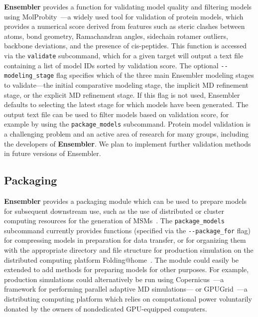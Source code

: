 \documentclass[10pt,letterpaper]{article}
\begin{document}
{\bf Ensembler} provides a function for validating model quality and filtering models using MolProbity~\cite{molprobity:2007,molprobity:2010}---a widely used tool for validation of protein models, which provides a numerical score derived from features such as steric clashes between atoms, bond geometry, Ramachandran angles, sidechain rotamer outliers, backbone deviations, and the presence of cis-peptides.
This function is accessed via the {\tt validate} subcommand, which for a given target will output a text file containing a list of model IDs sorted by validation score.
The optional {\tt -{}-modeling\_stage} flag specifies which of the three main Ensembler modeling stages to validate---the initial comparative modeling stage, the implicit MD refinement stage, or the explicit MD refinement stage.
If this flag is not used, Ensembler defaults to selecting the latest stage for which models have been generated.
The output text file can be used to filter models based on validation score, for example by using the {\tt package\_models} subcommand.
Protein model validation is a challenging problem and an active area of research for many groups, including the developers of {\bf Ensembler}.
We plan to implement further validation methods in future versions of Ensembler.

\subsection*{Packaging}

{\bf Ensembler} provides a packaging module which can be used to prepare models for subsequent downstream use, such as the use of distributed or cluster computing resources for the generation of MSMs~\cite{pande-beauchamp-bowman:2010:methods:markov-model-review,noe:jcp:2011:msm-review,chodera-noe:curr-opin-struct-biol:2014:msm-review}.
The {\tt package\_models} subcommand currently provides functions (specified via the {\tt -{}-package\_for} flag) for compressing models in preparation for data transfer, or for organizing them with the appropriate directory and file structure for production simulation on the distributed computing platform Folding@home~\cite{shirts-pande:science:2000:fah}.
The module could easily be extended to add methods for preparing models for other purposes.
For example, production simulations could alternatively be run using Copernicus~\cite{pronk:2011:copernicus,pronk:2015:copernicus}---a framework for performing parallel adaptive MD simulations--- or GPUGrid~\cite{buch:2010:gpugrid}---a distributing computing platform which relies on computational power voluntarily donated by the owners of nondedicated GPU-equipped computers. 
\end{document}
